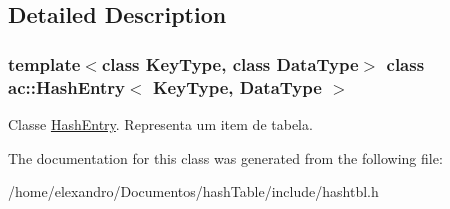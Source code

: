 \subsection{Detailed Description}
\subsubsection*{template$<$class Key\+Type, class Data\+Type$>$\newline
class ac\+::\+Hash\+Entry$<$ Key\+Type, Data\+Type $>$}

Classe \hyperlink{classac_1_1_hash_entry}{Hash\+Entry}. Representa um item de tabela. 

The documentation for this class was generated from the following file\+:\begin{DoxyCompactItemize}
\item 
/home/elexandro/\+Documentos/hash\+Table/include/hashtbl.\+h\end{DoxyCompactItemize}
